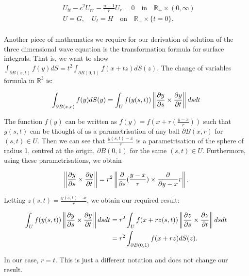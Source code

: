 \documentclass[a4paper, 12pt]{article}
\numberwithin{equation}{section}
\begin{document}
\begin{equation} \label{EPDeq}
    \begin{aligned}
        &U_{tt}-c^2U_{rr}-\frac{n-1}{r}U_r=0 \quad \textrm{in} \quad \mathbb{R}_+ \times (0,\infty)\\
        &U=G, \quad U_t=H \quad \textrm{on} \quad \mathbb{R}_+ \times \{ t=0 \}.
    \end{aligned}
\end{equation}
\\

Another piece of mathematics we require for our derivation of solution of the three dimensional wave equation is the transformation formula for surface integrals. That is,
we want to show $\int_{\partial B(x,t)}f(y)dS=t^2\int_{\partial B(0,1)} f(x+tz)dS(z)$. The change of variables formula in $\mathbb{R}^3$ \cite{LooSter} is:

\begin{equation*}
    \int_{\partial B(x,r)}f(y)dS(y)=\int_U f(y(s,t))\left\| \diffp[1]{y}{s} \times \diffp[1]{y}{t} \right \|ds dt
\end{equation*}

The function $f(y)$ can be written as $f(y)=f(x+r(\frac{y-x}{r}))$ such that $y(s,t)$ can be thought of as a parametrisation of any ball $\partial B(x,r)$ for $(s,t)\in U$. Then we can see
that $\frac{y(s,t)-x}{r}$ is a parametrisation of the sphere of radius 1, centred at the origin, $\partial B(0,1)$ for the same $(s,t)\in U$. Furthermore, using these parametrisations, we obtain

\begin{equation*}
    \left \| \diffp[1]{y}{s} \times \diffp[1]{y}{t} \right \| =r^2 \left \| \diffp[1]{}{s}(\frac{y-x}{r}) \times \diffp[1]{}{y-x}{r} \right \|.
\end{equation*}

Letting $z(s,t)=\frac{y(s,t)-x}{r}$, we obtain our required result:

\begin{equation*}
    \begin{aligned}
    \int_U f(y(s,t)) \left \| \diffp[1]{y}{s} \times \diffp{y}{t} \right \| dsdt&=r^2\int_U f(x+rz(s,t)) \left \| \diffp[1]{z}{s} \times \diffp[1]{z}{t} \right \| dsdt\\
    &=r^2\int_{\partial B(0,1)}f(x+rz)dS(z).
    \end{aligned}
\end{equation*}

In our case, $r=t$. This is just a different notation and does not change our result.
\end{document}
